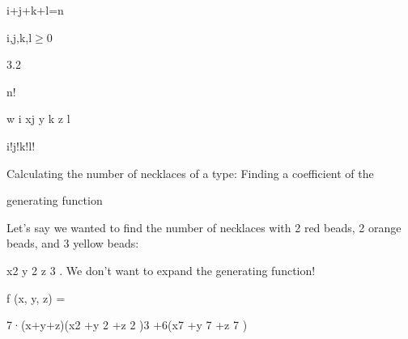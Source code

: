 \documentclass[a4paper,portrait,12pt]{article}
\begin{document}
\begin{flushleft}
i+j+k+l=n
\end{flushleft}


\begin{flushleft}
i,j,k,l$\geq$0
\end{flushleft}





3.2





\begin{flushleft}
n!
\end{flushleft}


\begin{flushleft}
w i xj y k z l
\end{flushleft}


\begin{flushleft}
i!j!k!l!
\end{flushleft}





\begin{flushleft}
Calculating the number of necklaces of a type: Finding a coefficient of the
\end{flushleft}


\begin{flushleft}
generating function
\end{flushleft}





\begin{flushleft}
Let's say we wanted to find the number of necklaces with 2 red beads, 2 orange beads, and 3 yellow beads:
\end{flushleft}


\begin{flushleft}
x2 y 2 z 3 . We don't want to expand the generating function!
\end{flushleft}





\begin{flushleft}
f (x, y, z) =
\end{flushleft}





\begin{flushleft}
7·(x+y+z)(x2 +y 2 +z 2 )3 +6(x7 +y 7 +z 7 )
\end{flushleft}
\end{document}
